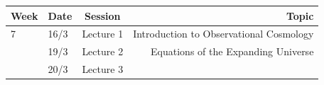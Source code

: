 \documentclass[11pt,a4paper]{book}
\begin{document}
\begin{longtable}[]{@{}llcr@{}}
\toprule
\begin{minipage}[b]{0.05\columnwidth}\raggedright
Week\strut
\end{minipage} & \begin{minipage}[b]{0.09\columnwidth}\raggedright
Date\strut
\end{minipage} & \begin{minipage}[b]{0.19\columnwidth}\centering
Session\strut
\end{minipage} & \begin{minipage}[b]{0.55\columnwidth}\raggedleft
Topic\strut
\end{minipage}\tabularnewline
\midrule
\endhead
\begin{minipage}[t]{0.05\columnwidth}\raggedright
7\strut
\end{minipage} & \begin{minipage}[t]{0.09\columnwidth}\raggedright
16/3\strut
\end{minipage} & \begin{minipage}[t]{0.19\columnwidth}\centering
Lecture 1\strut
\end{minipage} & \begin{minipage}[t]{0.55\columnwidth}\raggedleft
Introduction to Observational Cosmology\strut
\end{minipage}\tabularnewline
\begin{minipage}[t]{0.05\columnwidth}\raggedright
\strut
\end{minipage} & \begin{minipage}[t]{0.09\columnwidth}\raggedright
19/3\strut
\end{minipage} & \begin{minipage}[t]{0.19\columnwidth}\centering
Lecture 2\strut
\end{minipage} & \begin{minipage}[t]{0.55\columnwidth}\raggedleft
Equations of the Expanding Universe\strut
\end{minipage}\tabularnewline
\begin{minipage}[t]{0.05\columnwidth}\raggedright
\strut
\end{minipage} & \begin{minipage}[t]{0.09\columnwidth}\raggedright
20/3\strut
\end{minipage} & \begin{minipage}[t]{0.19\columnwidth}\centering
Lecture 3\strut
\end{minipage} & \begin{minipage}[t]{0.55\columnwidth}\raggedleft

\end{minipage}
\end{longtable}
\end{document}
